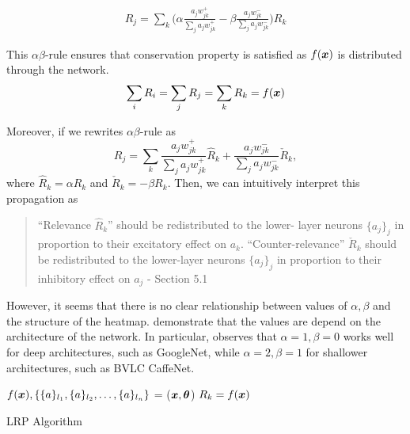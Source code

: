 \begin{align}
	R_j = \sum_{k} 	\bigg( \alpha\frac{a_j w_{jk}^+}{\sum_{j} a_jw_{jk}^+} - \beta\frac{a_j w_{jk}^-}{\sum_{j} a_jw_{jk}^-} \bigg )  R_{k}
\end{align}


This $\alpha\beta$-rule ensures that conservation property is satisfied as $f(\patvector{x})$ is distributed through the network. 
\begin{align*}
	\sum_{i} R_i = 	\sum_{j} R_j = 	\sum_{k} R_k = f(\patvector{x})
\end{align*}

Moreover, if we rewrites  $\alpha\beta$-rule as 
$$
	R_j = \sum_{k}  \frac{a_j w_{jk}^+}{\sum_{j} a_jw_{jk}^+} \hat{R}_{k} + \frac{a_j w_{jk}^-}{\sum_{j} a_jw_{jk}^-} \check{R}_{k},
$$ 
where $\hat{R}_{k}  = \alpha R_{k}$ and  $\check{R}_{k} = -\beta R_{k} $. Then, we can intuitively interpret this propagation as 

\begin{quote}
``Relevance $\hat{R}_k$'' should be redistributed to the lower-
layer neurons $\{a_j\}_j$ in proportion to their excitatory effect on $a_k$. ``Counter-relevance'' $\check{R}_k $ should be redistributed to the lower-layer neurons $\{a_j\}_j$ in proportion to their inhibitory effect on $a_j$
	- Section 5.1 \cite{MontavonMethodsInterpretingUnderstanding2017}
\end{quote} 

However, it seems that there is no clear relationship between values of $\alpha,\beta$ and the structure of the heatmap. \cite{MontavonMethodsInterpretingUnderstanding2017, BinderLayerwiseRelevancePropagation2016} demonstrate that the values are depend on the architecture of the network. In particular, \cite{MontavonMethodsInterpretingUnderstanding2017} observes that $\alpha=1, \beta=0$ works well for deep architectures, such as GoogleNet\cite{SzegedyGoingDeeperConvolutions2014}, while  $\alpha=2, \beta=1$ for shallower architectures, such as BVLC CaffeNet\cite{JiaCaffeConvolutionalArchitecture2014}.



\begin{algorithm}[H]
$f(\patvector{x}), \{ \{a\}_{l_1}, \{a\}_{l_2}, \dots, \{a\}_{l_n}\}$ = ($\patvector{x}, \patvector{\theta}$)\;
$R_k = f(\patvector{x})$\;
 \caption{LRP Algorithm}
 \label{algo:lrp}
\end{algorithm}

